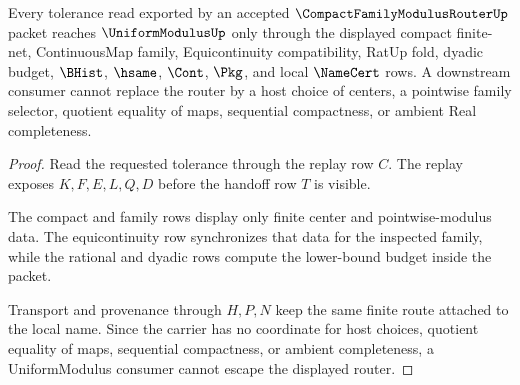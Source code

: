 \begin{theorem}
\label{thm:compact-family-modulus-router-tolerance-nonescape}
Every tolerance read exported by an accepted $\CompactFamilyModulusRouterUp$ packet reaches $\UniformModulusUp$ only through the displayed compact finite-net, ContinuousMap family, Equicontinuity compatibility, RatUp fold, dyadic budget, $\BHist$, $\hsame$, $\Cont$, $\Pkg$, and local $\NameCert$ rows. A downstream consumer cannot replace the router by a host choice of centers, a pointwise family selector, quotient equality of maps, sequential compactness, or ambient Real completeness.
\end{theorem}
\begin{proof}
Read the requested tolerance through the replay row $C$. The replay exposes $K,F,E,L,Q,D$ before the handoff row $T$ is visible.

The compact and family rows display only finite center and pointwise-modulus data. The equicontinuity row synchronizes that data for the inspected family, while the rational and dyadic rows compute the lower-bound budget inside the packet.

Transport and provenance through $H,P,N$ keep the same finite route attached to the local name. Since the carrier has no coordinate for host choices, quotient equality of maps, sequential compactness, or ambient completeness, a UniformModulus consumer cannot escape the displayed router.
\end{proof}




